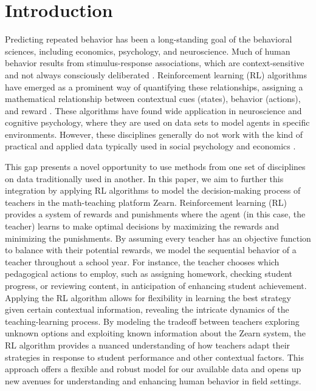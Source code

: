 \documentclass[
  number,
  preprint,
  3p,
  onecolumn]{elsarticle}
\begin{document}
\hypertarget{introduction}{%
\section{Introduction}\label{introduction}}

Predicting repeated behavior has been a long-standing goal of the
behavioral sciences, including economics, psychology, and neuroscience.
Much of human behavior results from stimulus-response associations,
which are context-sensitive and not always consciously deliberated
\citep{buyalskaya2023}. Reinforcement learning (RL) algorithms have
emerged as a prominent way of quantifying these relationships, assigning
a mathematical relationship between contextual cues (states), behavior
(actions), and reward \citep{sutton2018}. These algorithms have found
wide application in neuroscience and cognitive psychology, where they
are used on data sets to model agents in specific environments. However,
these disciplines generally do not work with the kind of practical and
applied data typically used in social psychology and economics
\citep{buyalskaya2023}.

This gap presents a novel opportunity to use methods from one set of
disciplines on data traditionally used in another. In this paper, we aim
to further this integration by applying RL algorithms to model the
decision-making process of teachers in the math-teaching platform Zearn.
Reinforcement learning (RL) provides a system of rewards and punishments
where the agent (in this case, the teacher) learns to make optimal
decisions by maximizing the rewards and minimizing the punishments. By
assuming every teacher has an objective function to balance with their
potential rewards, we model the sequential behavior of a teacher
throughout a school year. For instance, the teacher chooses which
pedagogical actions to employ, such as assigning homework, checking
student progress, or reviewing content, in anticipation of enhancing
student achievement. Applying the RL algorithm allows for flexibility in
learning the best strategy given certain contextual information,
revealing the intricate dynamics of the teaching-learning process. By
modeling the tradeoff between teachers exploring unknown options and
exploiting known information about the Zearn system, the RL algorithm
provides a nuanced understanding of how teachers adapt their strategies
in response to student performance and other contextual factors. This
approach offers a flexible and robust model for our available data and
opens up new avenues for understanding and enhancing human behavior in
field settings.
\end{document}
